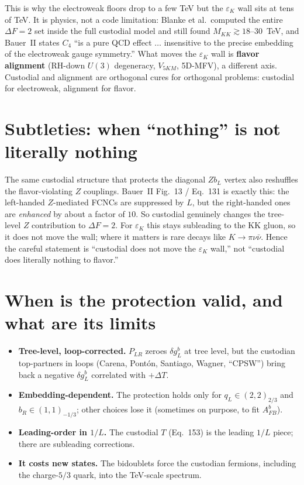 \documentclass[11pt]{article}
\begin{document}
This is why the electroweak floors drop to a few TeV but the $\varepsilon_K$ wall
sits at tens of TeV. It is physics, not a code limitation: Blanke et al.\ computed
the entire $\Delta F=2$ set inside the full custodial model and still found
$M_{KK}\gtrsim18$--$30$~TeV, and Bauer~II states $C_4$ ``is a pure QCD effect
$\ldots$ insensitive to the precise embedding of the electroweak gauge symmetry.''
What moves the $\varepsilon_K$ wall is \textbf{flavor alignment} (RH-down $U(3)$
degeneracy, $V_{5KM}$, 5D-MFV), a different axis. Custodial and alignment are
orthogonal cures for orthogonal problems: custodial for electroweak, alignment for
flavor.

\section{Subtleties: when ``nothing'' is not literally nothing}

The same custodial structure that protects the diagonal $Z b_L$ vertex also reshuffles
the flavor-violating $Z$ couplings. Bauer~II Fig.~13 / Eq.~131 is exactly this: the
left-handed $Z$-mediated FCNCs are suppressed by $L$, but the right-handed ones are
\emph{enhanced} by about a factor of $10$. So custodial genuinely changes the
tree-level $Z$ contribution to $\Delta F=2$. For $\varepsilon_K$ this stays subleading
to the KK gluon, so it does not move the wall; where it matters is rare decays like
$K\to\pi\nu\bar\nu$. Hence the careful statement is ``custodial does not move the
$\varepsilon_K$ wall,'' not ``custodial does literally nothing to flavor.''

\section{When is the protection valid, and what are its limits}

\begin{itemize}
\item \textbf{Tree-level, loop-corrected.} $P_{LR}$ zeroes $\delta g_L^b$ at tree
level, but the custodian top-partners in loops (Carena, Pont\'on, Santiago, Wagner,
``CPSW'') bring back a negative $\delta g_L^b$ correlated with $+\Delta T$.
\item \textbf{Embedding-dependent.} The protection holds only for
$q_L\in(2,2)_{2/3}$ and $b_R\in(1,1)_{-1/3}$; other choices lose it (sometimes on
purpose, to fit $A_{FB}^b$).
\item \textbf{Leading-order in $1/L$.} The custodial $T$ (Eq.~153) is the leading
$1/L$ piece; there are subleading corrections.
\item \textbf{It costs new states.} The bidoublets force the custodian fermions,
including the charge-$5/3$ quark, into the TeV-scale spectrum.
\end{itemize}
\end{document}
